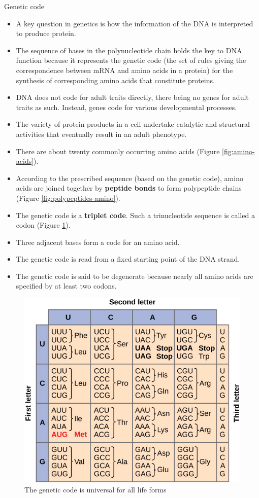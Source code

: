 \documentclass[11pt,ignorenonframetext,aspectratio=169]{beamer}
\providecommand{\tightlist}{%
  \setlength{\itemsep}{0pt}\setlength{\parskip}{0pt}}
\begin{document}
\begin{frame}{Genetic code}
\protect\hypertarget{genetic-code}{}
\begin{itemize}
\tightlist
\item
  A key question in genetics is how the information of the DNA is
  interpreted to produce protein.
\item
  The sequence of bases in the polynucleotide chain holds the key to DNA
  function because it represents the genetic code (the set of rules
  giving the correspondence between mRNA and amino acids in a protein)
  for the synthesis of corresponding amino acids that constitute
  proteins.
\item
  DNA does not code for adult traits directly, there being no genes for
  adult traits as such. Instead, genes code for various developmental
  processes.
\item
  The variety of protein products in a cell undertake catalytic and
  structural activities that eventually result in an adult phenotype.
\end{itemize}
\end{frame}

\begin{frame}{}
\protect\hypertarget{section-16}{}
\begin{itemize}
\tightlist
\item
  There are about twenty commonly occurring amino acids (Figure
  \ref{fig:amino-acids}).
\item
  According to the prescribed sequence (based on the genetic code),
  amino acids are joined together by \textbf{peptide bonds} to form
  polypeptide chains (Figure \ref{fig:polypeptides-amino}).
\item
  The genetic code is a \textbf{triplet code}. Such a trinucleotide
  sequence is called a codon (Figure \ref{fig:universality}).
\item
  Three adjacent bases form a code for an amino acid.
\item
  The genetic code is read from a fixed starting point of the DNA
  strand.
\item
  The genetic code is said to be degenerate because nearly all amino
  acids are specified by at least two codons.
\end{itemize}
\end{frame}

\begin{frame}{}
\protect\hypertarget{section-17}{}
\begin{figure}
\includegraphics[width=0.45\linewidth]{./../images/nucleotide_codons} \caption{The genetic code is universal for all life forms}\label{fig:universality}
\end{figure}
\end{frame}
\end{document}
